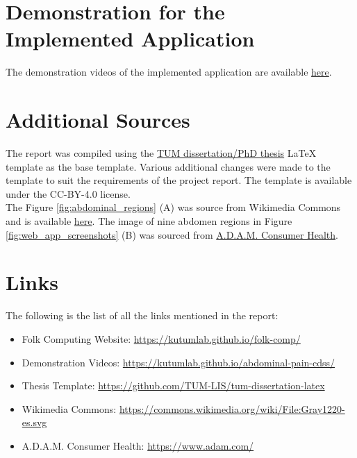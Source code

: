 \section{Demonstration for the Implemented Application}
\label{appendix:frontend_screenshots}
The demonstration videos of the implemented application are available \href{https://kutumlab.github.io/abdominal-pain-cdss/}{here}.

\section{Additional Sources}
\label{appendix:sources}
The report was compiled using the \href{https://github.com/TUM-LIS/tum-dissertation-latex}{TUM dissertation/PhD thesis} LaTeX template as the base template. Various additional changes were made to the template to suit the requirements of the project report. The template is available under the CC-BY-4.0 license.\\

\noindent The Figure \ref{fig:abdominal_regions} (A) was source from Wikimedia Commons and is available \href{https://commons.wikimedia.org/wiki/File:Gray1220-es.svg}{here}. The image of nine abdomen regions in Figure \ref{fig:web_app_screenshots} (B) was sourced from \href{https://www.adam.com/}{A.D.A.M. Consumer Health}.

\section{Links}
\label{appendix:links}
The following is the list of all the links mentioned in the report:
\begin{itemize}
    \item Folk Computing Website: \url{https://kutumlab.github.io/folk-comp/}
    \item Demonstration Videos: \url{https://kutumlab.github.io/abdominal-pain-cdss/}
    \item Thesis Template: \url{https://github.com/TUM-LIS/tum-dissertation-latex}
    \item Wikimedia Commons: \url{https://commons.wikimedia.org/wiki/File:Gray1220-es.svg}
    \item A.D.A.M. Consumer Health: \url{https://www.adam.com/}
\end{itemize}